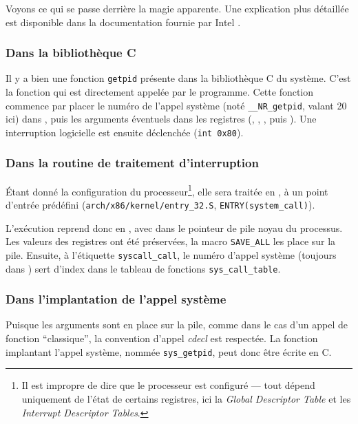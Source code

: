 Voyons ce qui se passe derrière la magie apparente. Une explication plus
détaillée est disponible dans la documentation fournie par Intel
\cite{intelsys}.

\subsubsection{Dans la bibliothèque C}

Il y a bien une fonction \texttt{getpid} présente dans la bibliothèque C du
système. C'est la fonction qui est directement appelée par le programme. Cette
fonction commence par placer le numéro de l'appel système (noté
\texttt{\_\_NR\_getpid}, valant 20 ici) dans \eax, puis les arguments éventuels
dans les registres (\ebx, \ecx, \edx, \esi puis \edi). Une interruption
logicielle est ensuite déclenchée (\texttt{int 0x80}).

\subsubsection{Dans la routine de traitement d'interruption}

Étant donné la configuration du processeur\footnote{Il est impropre de dire que
le processeur est configuré --- tout dépend uniquement de l'état de certains
registres, ici la \emph{Global Descriptor Table} et les \emph{Interrupt
Descriptor Tables}.}, elle sera traitée en , à un point d'entrée
prédéfini (\texttt{arch/x86/kernel/entry\_32.S}, \texttt{ENTRY(system\_call)}).


L'exécution reprend donc en , avec dans \esp le pointeur de pile noyau
du processus. Les valeurs des registres ont été préservées, la macro
\texttt{SAVE\_ALL} les place sur la pile. Ensuite, à l'étiquette
\texttt{syscall\_call}, le numéro d'appel système (toujours dans \eax) sert
d'index dans le tableau de fonctions \texttt{sys\_call\_table}.


\subsubsection{Dans l'implantation de l'appel système}

Puisque les arguments sont en place sur la pile, comme dans le cas d'un appel de
fonction ``classique'', la convention d'appel \emph{cdecl} est respectée. La
fonction implantant l'appel système, nommée \texttt{sys\_getpid}, peut donc être
écrite en C.


